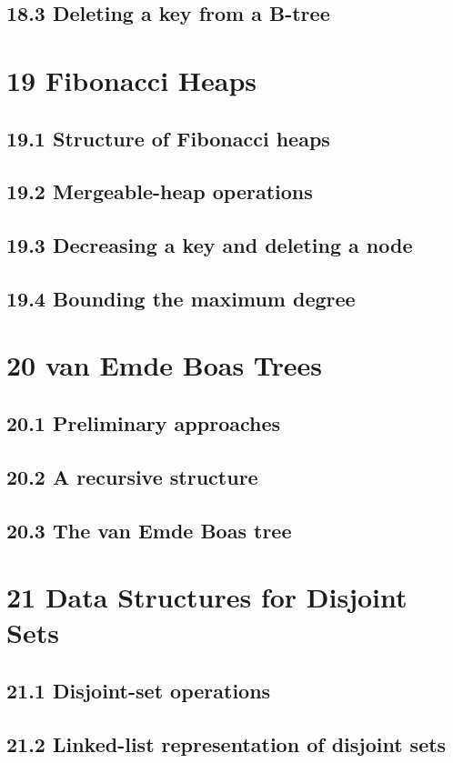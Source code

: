 \documentclass[a4paper]{article}
\begin{document}
\subsection{18.3 Deleting a key from a B-tree}

\newpage
\section{19 Fibonacci Heaps}
\subsection{19.1 Structure of Fibonacci heaps}
\subsection{19.2 Mergeable-heap operations}
\subsection{19.3 Decreasing a key and deleting a node}
\subsection{19.4 Bounding the maximum degree}

\newpage
\section{20 van Emde Boas Trees}
\subsection{20.1 Preliminary approaches}
\subsection{20.2 A recursive structure}
\subsection{20.3 The van Emde Boas tree}

\newpage
\section{21 Data Structures for Disjoint Sets}
\subsection{21.1 Disjoint-set operations}
\subsection{21.2 Linked-list representation of disjoint sets}
\end{document}
